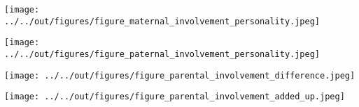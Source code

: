 \documentclass[%
    a4paper,            %
    11pt,               %
    bibliography=totoc, %
]
{scrartcl}
\begin{document}
\pagebreak

\clearpage

\centering
\texttt{[image: ../../out/figures/figure\_maternal\_involvement\_personality.jpeg]}

\texttt{[image: ../../out/figures/figure\_paternal\_involvement\_personality.jpeg]}

\texttt{[image: ../../out/figures/figure\_parental\_involvement\_difference.jpeg]}

\texttt{[image: ../../out/figures/figure\_parental\_involvement\_added\_up.jpeg]}

\pagebreak



\pagebreak
\nocite{*}

\singlespacing

\small

\end{document}
